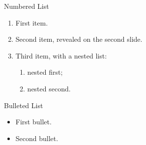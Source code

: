 \documentclass[aspectratio=169]{beamer}
\begin{document}
\begin{frame}{Numbered List}
  \begin{enumerate}
    \item First item.
    \item<2-> Second item, revealed on the second slide.
    \item Third item, with a nested list:
      \begin{enumerate}
        \item nested first;
        \item nested second.
      \end{enumerate}
  \end{enumerate}
\end{frame}

\begin{frame}{Bulleted List}
  \begin{itemize}
    \item First bullet.
    \item Second bullet.
  \end{itemize}
\end{frame}
\end{document}
